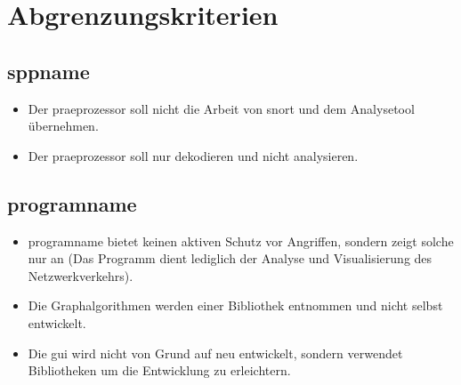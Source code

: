\section{Abgrenzungskriterien}

\subsection{\gls{sppname}}
\begin{itemize}
\item Der \gls{praeprozessor} soll nicht die Arbeit von \gls{snort} und dem Analysetool übernehmen.

\item Der \gls{praeprozessor} soll nur dekodieren und nicht analysieren.

\end{itemize}

\subsection{\gls{programname}}
\begin{itemize}

\item \gls{programname} bietet keinen aktiven Schutz vor Angriffen, sondern zeigt solche nur an (Das Programm dient lediglich der Analyse und Visualisierung des Netzwerkverkehrs).

\item Die Graphalgorithmen  werden einer Bibliothek entnommen und nicht selbst entwickelt.

\item Die \gls{gui} wird nicht von Grund auf neu entwickelt, sondern verwendet Bibliotheken um die Entwicklung zu erleichtern.

\end{itemize}
